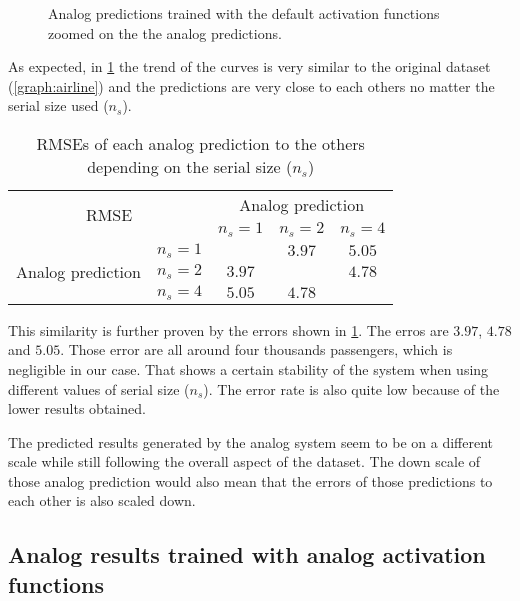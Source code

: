 \begin{figure}[H]
  \centering
  
  \caption{Analog predictions trained with the default activation functions zoomed on the the analog predictions.}
  \label{graph:airlineAnalogNoCZoomed}
\end{figure}

As expected, in \cref{graph:airlineAnalogNoCZoomed} the trend of the curves is very similar to the original dataset (\cref{graph:airline}) and the predictions are very close to each others no matter the serial size used ($n_s$).

\begin{table}[H]
  \centering
  \begin{tabular}{|c|c|c|c|c|}
    \hline
    \multicolumn{2}{|c}{\multirow{2}{*}{\ac{RMSE}}} & \multicolumn{3}{|c|}{Analog prediction}\\
    \cline{3-5}
    \multicolumn{2}{|c}{} & \multicolumn{1}{|c|}{$n_s=1$} & $n_s=2$ & $n_s=4$ \\
    \hline
    \multirow{3}{*}{Analog prediction} & $n_s=1$ &\cellcolor[HTML]{202020} & $3.97$ & $5.05$\\
    \cline{2-5}
    & $n_s=2$  & $3.97$ & \cellcolor[HTML]{202020} & $4.78$\\
    \cline{2-5}
    & $n_s=4$ & $5.05$ & $4.78$ & \cellcolor[HTML]{202020}\\
    \hline
  \end{tabular}
  \caption{\acp{RMSE} of each analog prediction to the others depending on the serial size ($n_s$)}
  \label{tab:airlineAnalogNoCZoomed}
\end{table}

This similarity is further proven by the errors shown in \cref{tab:airlineAnalogNoCZoomed}. The erros are $3.97$, $4.78$ and $5.05$. Those error are all around four thousands passengers, which is negligible in our case. That shows a certain stability of the system when using different values of serial size ($n_s$). The error rate is also quite low because of the lower results obtained.

The predicted results generated by the analog system seem to be on a different scale while still following the overall aspect of the dataset. The down scale of those analog prediction would also mean that the errors of those predictions to each other is also scaled down.

\subsection{Analog results trained with analog activation functions}


